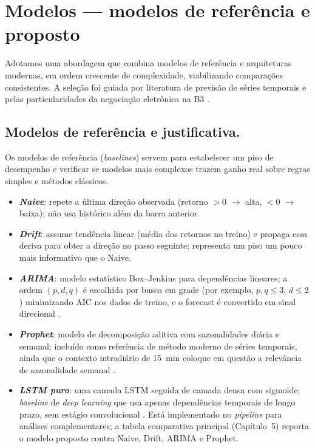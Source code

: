 \section{Modelos — modelos de referência e proposto}

Adotamos uma abordagem que combina modelos de referência e arquiteturas modernas, em ordem crescente de complexidade, viabilizando comparações consistentes. A seleção foi guiada por literatura de previsão de séries temporais e pelas particularidades da negociação eletrônica na B3 \cite{b3_manual_negociacao,hyndman_2018,box_2015,taylor_2018,hochreiter_1997,borovykh_2017}.

\subsection{Modelos de referência e justificativa.} Os modelos de referência (\textit{baselines}) servem para estabelecer um piso de desempenho e verificar se modelos mais complexos trazem ganho real sobre regras simples e métodos clássicos. 

\begin{itemize}
  \item \textit{\textbf{Naive}}: repete a última direção observada (retorno $>0$ $\rightarrow$ alta, $<0$ $\rightarrow$ baixa); não usa histórico além da barra anterior. 

  \item \textit{\textbf{Drift}}: assume tendência linear (média dos retornos no treino) e propaga essa deriva para obter a direção no passo seguinte; representa um piso um pouco mais informativo que o Naive. 

  \item \textit{\textbf{ARIMA}}: modelo estatístico Box--Jenkins para dependências lineares; a ordem $(p,d,q)$ é escolhida por busca em grade (por exemplo, $p,q \leq 3$, $d \leq 2$) minimizando AIC nos dados de treino, e o forecast é convertido em sinal direcional \cite{box_2015}.

  \item \textit{\textbf{Prophet}}: modelo de decomposição aditiva com sazonalidades diária e semanal; incluído como referência de método moderno de séries temporais, ainda que o contexto intradiário de 15~min coloque em questão a relevância de sazonalidade semanal \cite{taylor_2018}. 

  \item \textit{\textbf{LSTM puro}}: uma camada LSTM seguida de camada densa com sigmoide; \textit{baseline} de \textit{deep learning} que usa apenas dependências temporais de longo prazo, sem estágio convolucional \cite{hochreiter_1997}. Está implementado no \textit{pipeline} para análises complementares; a tabela comparativa principal (Capítulo~5) reporta o modelo proposto contra Naive, Drift, ARIMA e Prophet.
\end{itemize}



